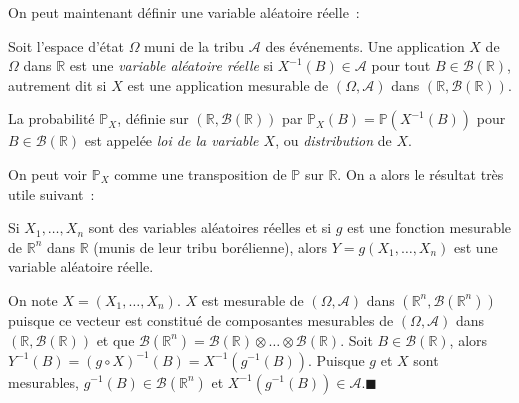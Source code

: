 On peut maintenant définir une variable aléatoire réelle~:

\begin{definition}\label{I-defvar}

Soit l'espace d'état \(\Omega\) muni de la tribu \(\mathcal{A}\) des
événements. Une application \(X\) de \(\Omega\) dans \(\mathbb{R}\) est
une \emph{variable aléatoire réelle} si \(X^{-1}(B) \in \mathcal{A}\)
pour tout \(B \in \mathcal{B}(\mathbb{R})\), autrement dit si \(X\) est
une application mesurable de \((\Omega, \mathcal{A})\) dans
\((\mathbb{R},\mathcal{B}(\mathbb{R}))\).
\end{definition}

\begin{definition}\label{I-defloivar}

La probabilité \(\mathbb{P}_X\), définie sur
\((\mathbb{R},\mathcal{B}(\mathbb{R}))\) par
\(\mathbb{P}_X (B) = \mathbb{P}(X^{-1}(B))\) pour
\(B \in \mathcal{B}(\mathbb{R})\) est appelée \emph{loi de la variable
\(X\)}, ou \emph{distribution} de \(X\).
\end{definition}

On peut voir \(\mathbb{P}_X\) comme une transposition de \(\mathbb{P}\)
sur \(\mathbb{R}\). On a alors le résultat très utile suivant~:

\begin{proposition}[{Composition}]\label{I-composition}

Si \(X_1, \ldots, X_n\) sont des variables aléatoires réelles et si
\(g\) est une fonction mesurable de \(\mathbb{R}^n\) dans \(\mathbb{R}\)
(munis de leur tribu borélienne), alors \(Y = g(X_1,\ldots,X_n)\) est
une variable aléatoire réelle.
\end{proposition}

\begin{preuve}
On note \(X = (X_1, \ldots, X_n)\). \(X\) est mesurable de
\((\Omega,\mathcal{A})\) dans
\((\mathbb{R}^n,\mathcal{B}(\mathbb{R}^n))\) puisque ce vecteur est
constitué de composantes mesurables de \((\Omega,\mathcal{A})\) dans
\((\mathbb{R},\mathcal{B}(\mathbb{R}))\) et que
\(\mathcal{B}(\mathbb{R}^n) = \mathcal{B}(\mathbb{R})\otimes \ldots \otimes \mathcal{B}(\mathbb{R})\).
Soit \(B \in \mathcal{B}(\mathbb{R})\), alors
\(Y^{-1}(B) = (g \circ X)^{-1}(B) = X^{-1}(g^{-1}(B))\). Puisque \(g\)
et \(X\) sont mesurables, \(g^{-1}(B) \in \mathcal{B}(\mathbb{R}^n)\) et
\(X^{-1}(g^{-1}(B))\in \mathcal{A}\).\hfill$\blacksquare$
\end{preuve}

